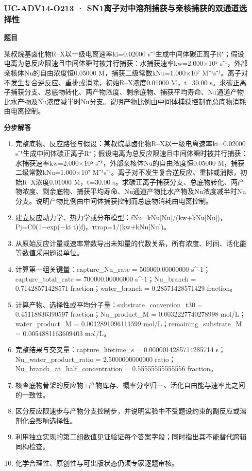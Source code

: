 \documentclass[UTF8,11pt,a4paper]{ctexart}
\begin{document}
\subsubsection*{UC-ADV14-O213 · SN1离子对中溶剂捕获与亲核捕获的双通道选择性}
\noindent\textbf{题目}\par
某叔烷基卤化物R–X以一级电离速率ki=0.02000 s⁻¹生成中间体碳正离子R⁺；假设电离为总反应限速且中间体瞬时被并行捕获：水捕获速率kw=2.000×10⁵ s⁻¹，外部亲核体Nu的自由浓度恒0.05000 M，捕获二级常数kNu=1.000×10⁷ M⁻¹s⁻¹。离子对不发生复合逆反应、重排或消除，初始R–X浓度0.01000 M，t=30.00 s。求碳正离子捕获分支、总底物转化、两产物浓度、剩余底物、捕获平均寿命、Nu通道产物比水产物及Nu浓度减半时Nu分支。说明产物比例由中间体捕获控制而总底物消耗由电离控制。\par
\medskip\noindent\textbf{分步解答}
\begin{enumerate}
\item 完整底物、反应路径与假设：某叔烷基卤化物R–X以一级电离速率ki=0.02000 s⁻¹生成中间体碳正离子R⁺；假设电离为总反应限速且中间体瞬时被并行捕获：水捕获速率kw=2.000×10⁵ s⁻¹，外部亲核体Nu的自由浓度恒0.05000 M，捕获二级常数kNu=1.000×10⁷ M⁻¹s⁻¹。离子对不发生复合逆反应、重排或消除，初始R–X浓度0.01000 M，t=30.00 s。求碳正离子捕获分支、总底物转化、两产物浓度、剩余底物、捕获平均寿命、Nu通道产物比水产物及Nu浓度减半时Nu分支。说明产物比例由中间体捕获控制而总底物消耗由电离控制。
\item 建立反应动力学、热力学或分布模型：fNu=kNu[Nu]/(kw+kNu[Nu])，Pj=C0(1−exp(−ki t))fj，τtrap=1/(kw+kNu[Nu])。
\item 从原始反应计量或速率常数导出未知量的代数关系，所有浓度、时间、活化能等数值采用题设单位。
\item 计算第一组关键量：capture\_Nu\_rate = 500000.00000000 s\textasciicircum{}-1；capture\_total\_rate = 700000.00000000 s\textasciicircum{}-1；Nu\_branch = 0.71428571428571 fraction；water\_branch = 0.28571428571429 fraction。
\item 计算产物、选择性或平均分子量：substrate\_conversion\_t30 = 0.45118836390597 fraction；Nu\_product\_M = 0.0032227740278998 mol/L；water\_product\_M = 0.0012891096111599 mol/L；remaining\_substrate\_M = 0.0054881163609403 mol/L。
\item 完整结果与交叉量：capture\_lifetime\_s = 0.0000014285714285714 s；Nu\_water\_product\_ratio = 2.5000000000000 ratio；Nu\_branch\_at\_half\_concentration = 0.55555555555556 fraction。
\item 核查底物骨架的反应物+产物库存、概率分率归一、活化自由能与速率比之间的一致性。
\item 区分反应限速步与产物分支控制步，并说明实验中不受题设约束的副反应或溶剂化会影响选择性。
\item 利用独立实现的第二组数值见证验证每个答案字段；同时指出其不能替代跨辑同构检查。
\item 化学合理性、原创性与可出版状态仍须专家逐题审核。
\end{enumerate}
\end{document}

